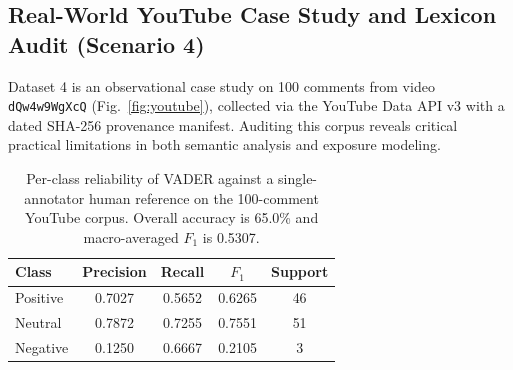 \documentclass[journal]{IEEEtran}
\begin{document}
\subsection{Real-World YouTube Case Study and Lexicon Audit (Scenario 4)}
Dataset 4 is an observational case study on 100 comments from video \texttt{dQw4w9WgXcQ} (Fig.~\ref{fig:youtube}), collected via the YouTube Data API v3 with a dated SHA-256 provenance manifest. Auditing this corpus reveals critical practical limitations in both semantic analysis and exposure modeling.

\begin{table}[t]
\caption{Per-class reliability of VADER against a single-annotator human reference on the 100-comment YouTube corpus. Overall accuracy is 65.0\% and macro-averaged $F_1$ is 0.5307.}
\label{tab:lexicon}
\centering
\footnotesize
\begin{tabular}{lcccc}
\toprule
\textbf{Class} & \textbf{Precision} & \textbf{Recall} & \textbf{$F_1$} & \textbf{Support} \\
\midrule
Positive & 0.7027 & 0.5652 & 0.6265 & 46 \\
Neutral  & 0.7872 & 0.7255 & 0.7551 & 51 \\
Negative & 0.1250 & 0.6667 & 0.2105 & 3 \\
\bottomrule
\end{tabular}
\end{table}
\end{document}
